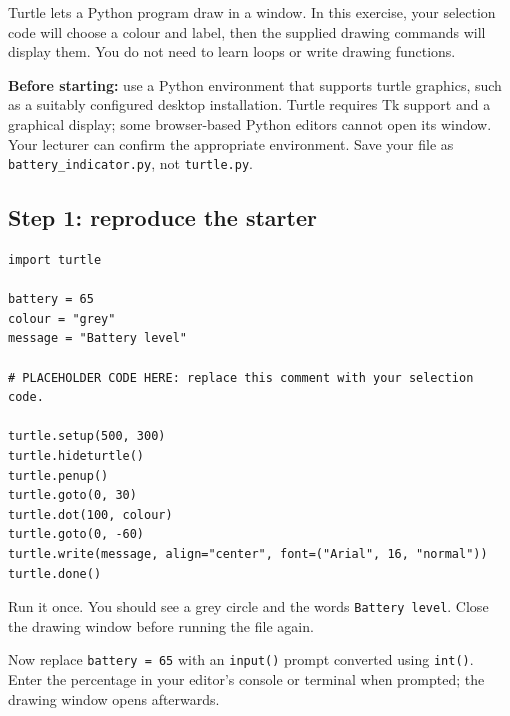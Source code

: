\documentclass[12pt,a4paper]{article}
\begin{document}
Turtle lets a Python program draw in a window. In this exercise, your selection code will choose a colour and label, then the supplied drawing commands will display them. You do not need to learn loops or write drawing functions.

\textbf{Before starting:} use a Python environment that supports turtle graphics, such as a suitably configured desktop installation. Turtle requires Tk support and a graphical display; some browser-based Python editors cannot open its window. Your lecturer can confirm the appropriate environment. Save your file as \texttt{battery\_indicator.py}, not \texttt{turtle.py}.

\subsection*{Step 1: reproduce the starter}
\begin{minipage}{\linewidth}
\begin{lstlisting}
import turtle

battery = 65
colour = "grey"
message = "Battery level"

# PLACEHOLDER CODE HERE: replace this comment with your selection code.

turtle.setup(500, 300)
turtle.hideturtle()
turtle.penup()
turtle.goto(0, 30)
turtle.dot(100, colour)
turtle.goto(0, -60)
turtle.write(message, align="center", font=("Arial", 16, "normal"))
turtle.done()
\end{lstlisting}
\end{minipage}
\par
Run it once. You should see a grey circle and the words \texttt{Battery level}. Close the drawing window before running the file again.

Now replace \texttt{battery = 65} with an \texttt{input()} prompt converted using \texttt{int()}. Enter the percentage in your editor’s console or terminal when prompted; the drawing window opens afterwards.
\end{document}
